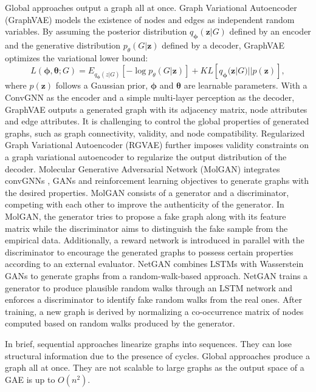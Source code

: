     Global approaches output a graph all at once.  Graph Variational Autoencoder (GraphVAE) \cite{simonovsky2018graphvae} models the existence of nodes and edges as independent random variables. By assuming the posterior distribution $q_\mathbf{\phi}(\mathbf{z}|G)$ defined by an encoder and the generative distribution $p_\theta(G|\mathbf{z})$ defined by a decoder, GraphVAE optimizes the variational lower bound:
    \begin{equation}
L(\mathbf{\phi},\mathbf{\theta};G)= E_{q_\mathbf{\phi}(z|G)}[-\log p_\theta(G|\mathbf{z})]+KL[q_\mathbf{\phi}(\mathbf{z}|G)||p(\mathbf{z})],
    \end{equation}
    where $p(\mathbf{z})$ follows a Gaussian prior, $\mathbf{\phi}$ and $\mathbf{\theta}$ are learnable parameters. With a ConvGNN as the encoder and a simple multi-layer perception as the decoder, GraphVAE outputs a generated graph with its adjacency matrix, node attributes and edge attributes. It is challenging to control the global properties of generated graphs, such as graph connectivity, validity, and node compatibility.  Regularized Graph Variational Autoencoder (RGVAE) \cite{ma2018constrained} further imposes validity constraints on a graph variational autoencoder to regularize the output distribution of the decoder. 
    Molecular Generative Adversarial Network (MolGAN) \cite{de2018molgan} integrates convGNNs \cite{schlichtkrull2018modeling}, GANs \cite{gulrajani2017improved} and reinforcement learning objectives to generate graphs with the desired properties. MolGAN consists of a generator and a discriminator, competing with each other to improve the authenticity of the generator. In MolGAN, the generator tries to propose a fake graph along with its feature matrix while the discriminator aims to distinguish the fake sample from the empirical data. Additionally, a reward network is introduced in parallel with the discriminator to encourage the generated graphs to possess certain properties according to an external evaluator. 
    NetGAN \cite{bojchevski2018netgan} combines LSTMs \cite{hochreiter1997long} with Wasserstein GANs \cite{arjovsky2017wasserstein} to generate graphs from a random-walk-based approach. NetGAN trains a generator to produce plausible random walks through an LSTM network and enforces a discriminator to identify fake random walks from the real ones. After training, a new graph is derived by normalizing a co-occurrence matrix of nodes computed based on random walks produced by the generator. 
    
    In brief, sequential approaches linearize graphs into sequences. They can lose structural information due to the presence of cycles.  Global approaches produce a graph all at once. They are not scalable to large graphs as the output space of a GAE is up to $O(n^2)$.
    

